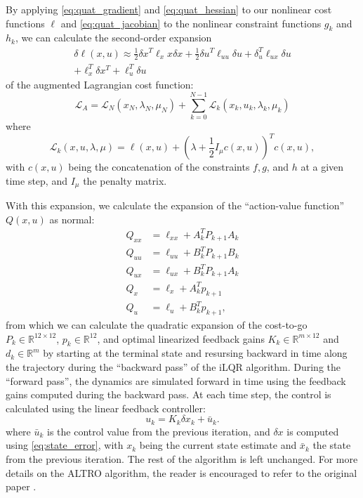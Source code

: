 \documentclass[letterpaper, 10 pt, conference]{ieeeconf}  %
\newcommand{\half}{\frac{1}{2}}
\newcommand{\R}{\mathbb{R}}
\begin{document}
    By applying \eqref{eq:quat_gradient} and \eqref{eq:quat_hessian} to our nonlinear cost
    functions $\ell$ and 
    \eqref{eq:quat_jacobian} to the nonlinear constraint functions $g_k$ and $h_k$, we can calculate
    the second-order expansion 
    \begin{multline}
        \delta \ell(x,u) \approx  \half \delta x^T \ell_xx \delta x
            + \half \delta u^T \ell_{uu} \delta u + \delta_u^T \ell_{ux} \delta u \\
            + \ell_x^T \delta x^T + \ell_u^T \delta u 
    \end{multline}
    of the augmented Lagrangian cost function:
    \begin{equation}
        \mathcal{L}_A = \mathcal{L}_N(x_N,\lambda_N,\mu_N) + 
            \sum_{k=0}^{N-1} \mathcal{L}_k(x_k,u_k,\lambda_k,\mu_k)
    \end{equation}
    where
    \begin{equation}
        \mathcal{L}_k(x,u,\lambda,\mu) = \ell(x,u) + 
            (\lambda + \half I_\mu c(x,u))^T c(x,u),
    \end{equation}
    with $c(x,u)$ being the concatenation of the constraints $f,g$, and $h$ at a given time step,
    and $I_\mu$ the penalty matrix.

    With this expansion, we calculate the expansion of the ``action-value function'' $Q(x,u)$
    as normal:
    \begin{align}
        Q_{xx} &= \ell_{xx} + A_{k}^T P_{k+1} A_{k} \label{Qxx_exp}\\
        Q_{uu} &= \ell_{uu} + B_{k}^T P_{k+1} B_{k} \label{Quu_exp}\\
        Q_{ux} &= \ell_{ux} + B_{k}^T P_{k+1} A_{k} \label{Qux_exp}\\
        Q_x &= \ell_x  + A_{k}^T p_{k+1} \label{Qx_exp}\\
        Q_u &= \ell_u + B_{k}^T p_{k+1} \label{Qu_exp},
    \end{align}
    from which we can calculate the quadratic expansion of the cost-to-go 
    $P_k \in \R^{12 \times 12}$, $p_k \in \R^{12}$, and optimal linearized feedback gains 
    $K_k \in \R^{m \times 12}$ and $d_k \in \R^m$ by starting at the terminal state and
    resursing backward in time along the trajectory during the ``backward pass'' of the iLQR
    algorithm. During the ``forward pass'', the dynamics are simulated forward in time using
    the feedback gains computed during the backward pass. At each time step, the control is 
    calculated using the linear feedback controller: 
    \begin{equation} \label{eq:mlqr_control}
        u_k = K_k \delta x_k + \bar{u}_k.
    \end{equation}
    where $\bar{u}_k$ is the control value from the previous iteration, and $\delta x$ is
    computed using \eqref{eq:state_error}, with $x_k$ being the current state estimate
    and $\bar{x}_k$ the state from the previous iteration. The rest of the algorithm is
    left unchanged. For more details on the ALTRO algorithm, the reader is encouraged to
    refer to the original paper \cite{howell2019altro}.
\end{document}
